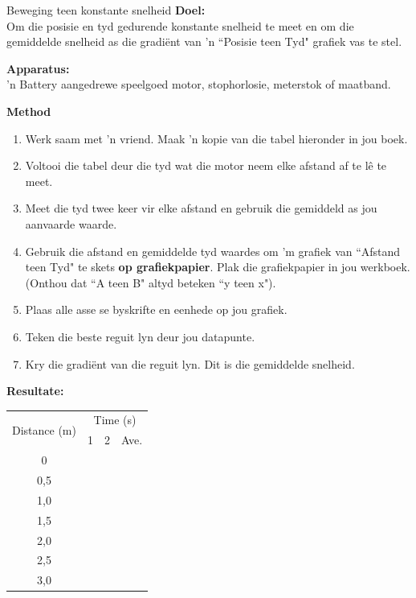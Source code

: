 \begin{g_experiment}{Beweging teen konstante snelheid}
            \nopagebreak
\textbf{Doel:}\\

Om die posisie en tyd gedurende konstante snelheid te meet en om die gemiddelde snelheid as die gradi\"ent van 'n ``Posisie teen Tyd" grafiek vas te stel.\par 

\textbf{Apparatus:}\\
'n Battery aangedrewe speelgoed motor, stophorlosie, meterstok of maatband.\par 
\textbf{Method}\\
\begin{enumerate}[noitemsep, label=\textbf{\arabic*}. ] 
    \item Werk saam met 'n vriend. Maak 'n kopie van die tabel hieronder in jou boek.
    \item Voltooi die tabel deur die tyd wat die motor neem elke afstand af te l\^e te meet.
    \item Meet die tyd twee keer vir elke afstand en gebruik die gemiddeld as jou aanvaarde waarde.
    \item Gebruik die afstand en gemiddelde tyd waardes om 'm grafiek van ``Afstand teen Tyd" te skets \textbf{op grafiekpapier}. Plak die grafiekpapier in jou werkboek. (Onthou dat ``A teen B" altyd beteken ``y teen x").
    \item Plaas alle asse se byskrifte en eenhede op jou grafiek.
    \item Teken die beste reguit lyn deur jou datapunte.
    \item Kry die gradi\"ent van die reguit lyn.  Dit is die gemiddelde snelheid.
\end{enumerate}
        \par 
\textbf{Resultate:}
\begin{center}
\begin{tabular}{|c|p{0.5cm}|p{0.5cm}|p{0.5cm}|}\hline
\multirow{2}{*}{Distance (m)}&\multicolumn{3}{c|}{Time (s)}\\\cline{2-4}
&1&2&Ave.\\\hline
0&&&\\\hline
0,5&&&\\\hline
1,0&&&\\\hline
1,5&&&\\\hline
2,0&&&\\\hline
2,5&&&\\\hline
3,0&&&\\\hline
\end{tabular}
\end{center}
    \par


\end{g_experiment}
